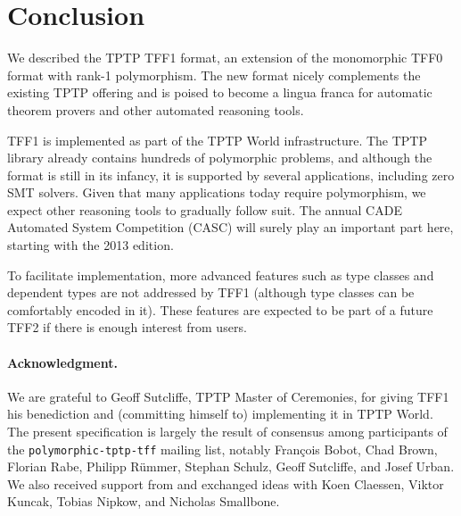 \section{Conclusion}
\label{sec_concl}

We described the TPTP TFF1 format, an extension of the monomorphic TFF0 format
with rank-1 polymorphism. The new format nicely complements the existing TPTP
offering and is poised to become a lingua franca for automatic theorem provers
and other automated reasoning tools.

TFF1 is implemented as part of the TPTP World infrastructure. The TPTP library
already contains hundreds of polymorphic problems, and although the format is
still in its infancy, it is supported by several applications, including zero
SMT solvers. Given that many applications today require polymorphism, we expect
other reasoning tools to gradually follow suit. The annual CADE Automated System
Competition (CASC) will surely play an important part here, starting with the
2013 edition.

To facilitate implementation, more advanced features such as type classes and
dependent types are not addressed by TFF1 (although type classes can be
comfortably encoded in it). These features are expected to be part of a future
TFF2 if there is enough interest from users.

\def\ackname{Acknowledgment}
\paragraph{\textbf{\upshape\ackname.}}
%
We are grateful to Geoff Sutcliffe, TPTP Master of Ceremonies, for giving TFF1
his benediction and (committing himself to) implementing it in TPTP World. The
present specification is largely the result of consensus among participants of
the {\tt polymorphic-tptp-tff} mailing list, notably Fran\c{c}ois Bobot, Chad
Brown, Florian Rabe, Philipp R\"ummer, Stephan Schulz, Geoff Sutcliffe, and
Josef Urban. We also received support from and exchanged ideas with Koen
Claessen, Viktor Kuncak, Tobias Nipkow, and Nicholas Smallbone.
